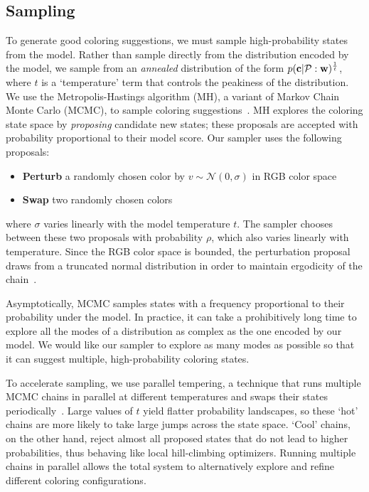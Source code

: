 \subsection{Sampling}
\label{sec:sampling}

To generate good coloring suggestions, we must sample high-probability states from the model. Rather than sample directly from the distribution encoded by the model, we sample from an \emph{annealed} distribution of the form $p(\mathbf{c} | \mathcal{P} : \mathbf{w})^\frac{1}{t}$, where $t$ is a `temperature' term that controls the peakiness of the distribution.
We use the Metropolis-Hastings algorithm (MH), a variant of Markov Chain Monte Carlo (MCMC), to sample coloring suggestions~\cite{Metropolis,Hastings}. MH explores the coloring state space by \emph{proposing} candidate new states; these proposals are accepted with probability proportional to their model score. Our sampler uses the following proposals:
\begin{itemize}
	\item{\textbf{Perturb} a randomly chosen color by $v \sim \mathcal{N}(0, \sigma)$ in RGB color space}
	\item{\textbf{Swap} two randomly chosen colors}
\end{itemize}
where $\sigma$ varies linearly with the model temperature $t$. The sampler chooses between these two proposals with probability $\rho$, which also varies linearly with temperature. Since the RGB color space is bounded, the perturbation proposal draws from a truncated normal distribution in order to maintain ergodicity of the chain~\cite{TruncatedGaussians}.

Asymptotically, MCMC samples states with a frequency proportional to their probability under the model. In practice, it can take a prohibitively long time to explore all the modes of a distribution as complex as the one encoded by our model. We would like our sampler to explore as many modes as possible so that it can suggest multiple, high-probability coloring states.

To accelerate sampling, we use parallel tempering, a technique that runs multiple MCMC chains in parallel at different temperatures and swaps their states periodically~\cite{ParallelTempering}. Large values of $t$ yield flatter probability landscapes, so these `hot' chains are more likely to take large jumps across the state space. `Cool' chains, on the other hand, reject almost all proposed states that do not lead to higher probabilities, thus behaving like local hill-climbing optimizers. Running multiple chains in parallel allows the total system to alternatively explore and refine different coloring configurations.

